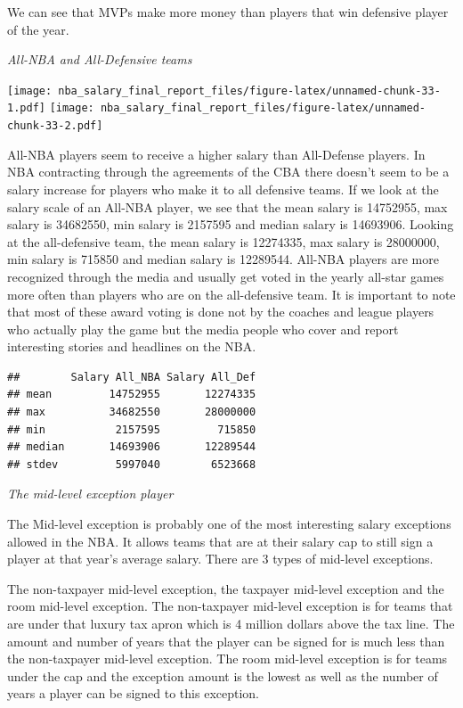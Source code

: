 \documentclass[]{article}
\begin{document}
We can see that MVPs make more money than players that win defensive
player of the year.

\emph{All-NBA and All-Defensive teams}

\texttt{[image: nba\_salary\_final\_report\_files/figure-latex/unnamed-chunk-33-1.pdf]}
\texttt{[image: nba\_salary\_final\_report\_files/figure-latex/unnamed-chunk-33-2.pdf]}

All-NBA players seem to receive a higher salary than All-Defense
players. In NBA contracting through the agreements of the CBA there
doesn't seem to be a salary increase for players who make it to all
defensive teams. If we look at the salary scale of an All-NBA player, we
see that the mean salary is 14752955, max salary is 34682550, min salary
is 2157595 and median salary is 14693906. Looking at the all-defensive
team, the mean salary is 12274335, max salary is 28000000, min salary is
715850 and median salary is 12289544. All-NBA players are more
recognized through the media and usually get voted in the yearly
all-star games more often than players who are on the all-defensive
team. It is important to note that most of these award voting is done
not by the coaches and league players who actually play the game but the
media people who cover and report interesting stories and headlines on
the NBA.

\begin{verbatim}
##        Salary All_NBA Salary All_Def
## mean         14752955       12274335
## max          34682550       28000000
## min           2157595         715850
## median       14693906       12289544
## stdev         5997040        6523668
\end{verbatim}

\emph{The mid-level exception player}

The Mid-level exception is probably one of the most interesting salary
exceptions allowed in the NBA. It allows teams that are at their salary
cap to still sign a player at that year's average salary. There are 3
types of mid-level exceptions.

The non-taxpayer mid-level exception, the taxpayer mid-level exception
and the room mid-level exception. The non-taxpayer mid-level exception
is for teams that are under that luxury tax apron which is 4 million
dollars above the tax line. The amount and number of years that the
player can be signed for is much less than the non-taxpayer mid-level
exception. The room mid-level exception is for teams under the cap and
the exception amount is the lowest as well as the number of years a
player can be signed to this exception.
\end{document}
